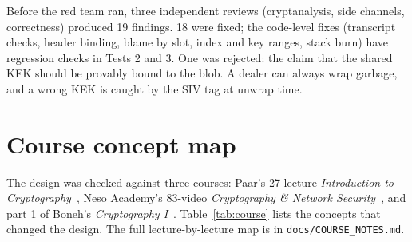 \documentclass[10pt,a4paper]{article}
\newcommand{\code}[1]{\texttt{#1}}
\theoremstyle{definition}
\theoremstyle{remark}
\begin{document}
Before the red team ran, three independent reviews (cryptanalysis, side channels, correctness) produced 19 findings. 18 were fixed; the code-level fixes (transcript checks, header binding, blame by slot, index and key ranges, stack burn) have regression checks in Tests 2 and 3. One was rejected: the claim that the shared KEK should be provably bound to the blob. A dealer can always wrap garbage, and a wrong KEK is caught by the SIV tag at unwrap time.

\section{Course concept map}\label{sec:course}

The design was checked against three courses: Paar's 27-lecture \emph{Introduction to Cryptography}~\cite{paarlectures,paarbook}, Neso Academy's 83-video \emph{Cryptography \& Network Security}~\cite{neso}, and part 1 of Boneh's \emph{Cryptography I}~\cite{boneh}. Table~\ref{tab:course} lists the concepts that changed the design. The full lecture-by-lecture map is in \code{docs/COURSE\_NOTES.md}.
\end{document}

